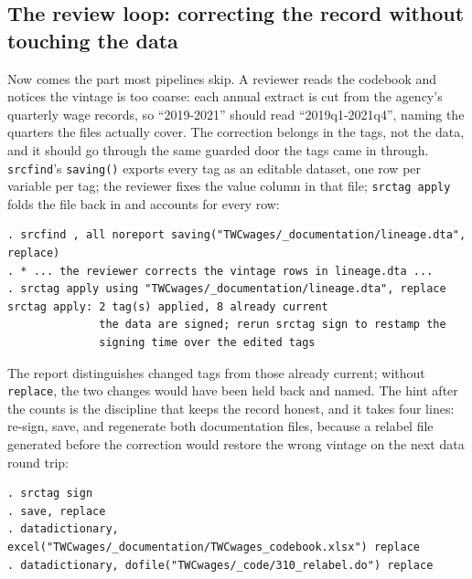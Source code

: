 \documentclass[
    a4paper,
    fontsize=10pt,
    twoside=true,
    numbers=noenddot,
]{kaobook}
\begin{document}
\subsection{The review loop: correcting the record without touching the data}
Now comes the part most pipelines skip. A reviewer reads the codebook and notices the vintage is too coarse: each annual extract is cut from the agency's quarterly wage records, so \enquote{2019-2021} should read \enquote{2019q1-2021q4}, naming the quarters the files actually cover. The correction belongs in the tags, not the data, and it should go through the same guarded door the tags came in through. \texttt{srcfind}'s \texttt{saving()} exports every tag as an editable dataset, one row per variable per tag; the reviewer fixes the value column in that file; \texttt{srctag apply} folds the file back in and accounts for every row:
\par
{\footnotesize
\begin{verbatim}
. srcfind , all noreport saving("TWCwages/_documentation/lineage.dta", replace)
. * ... the reviewer corrects the vintage rows in lineage.dta ...
. srctag apply using "TWCwages/_documentation/lineage.dta", replace
srctag apply: 2 tag(s) applied, 8 already current
              the data are signed; rerun srctag sign to restamp the
              signing time over the edited tags
\end{verbatim}
}
The report distinguishes changed tags from those already current; without \texttt{replace}, the two changes would have been held back and named. The hint after the counts is the discipline that keeps the record honest, and it takes four lines: re-sign, save, and regenerate both documentation files, because a relabel file generated before the correction would restore the wrong vintage on the next data round trip:
\par
{\footnotesize
\begin{verbatim}
. srctag sign
. save, replace
. datadictionary, excel("TWCwages/_documentation/TWCwages_codebook.xlsx") replace
. datadictionary, dofile("TWCwages/_code/310_relabel.do") replace
\end{verbatim}
}
\end{document}
